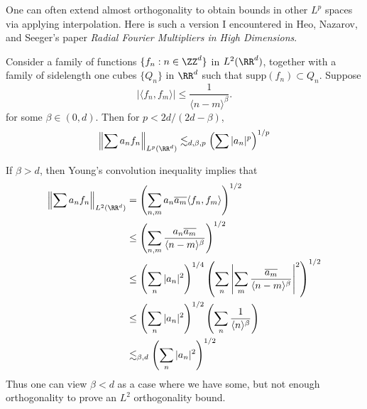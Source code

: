 One can often extend almost orthogonality to obtain bounds in other $L^p$ spaces via applying interpolation. Here is such a version I encountered in Heo, Nazarov, and Seeger's paper \emph{Radial Fourier Multipliers in High Dimensions}.

\begin{theorem}
  Consider a family of functions $\{ f_n : n \in \ZZ^d \}$ in $L^2(\RR^d)$, together with a family of sidelength one cubes $\{ Q_n \}$ in $\RR^d$ such that $\text{supp}(f_n) \subset Q_n$. Suppose
  \[ |\langle f_n, f_m \rangle| \leq \frac{1}{\langle n - m \rangle^\beta}. \]
  for some $\beta \in (0,d)$. Then for $p < 2d/(2d - \beta)$,
  \[ \left\| \sum a_n f_n \right\|_{L^p(\RR^d)} \lesssim_{d,\beta,p} \left( \sum |a_n|^p \right)^{1/p} \]
\end{theorem}

\begin{remark}
  If $\beta > d$, then Young's convolution inequality implies that
  \begin{align*}
    \left\| \sum a_n f_n \right\|_{L^2(\RR^d)} &= \left( \sum_{n,m} a_n \overline{a_m} \langle f_n,f_m \rangle \right)^{1/2}\\
    &\leq \left( \sum_{n,m} \frac{a_n \overline{a_m}}{\langle n - m \rangle^\beta} \right)^{1/2}\\
    &\leq \left( \sum_n |a_n|^2 \right)^{1/4} \left( \sum_n \left| \sum_m \frac{\overline{a_m}}{\langle n - m \rangle^\beta} \right|^2 \right)^{1/2}\\
    &\leq \left( \sum_n |a_n|^2 \right)^{1/2} \left( \sum_n \frac{1}{\langle n \rangle^\beta} \right)\\
    &\lesssim_{\beta,d} \left( \sum_n |a_n|^2 \right)^{1/2}
  \end{align*}
  Thus one can view $\beta < d$ as a case where we have some, but not enough orthogonality to prove an $L^2$ orthogonality bound.
\end{remark}

